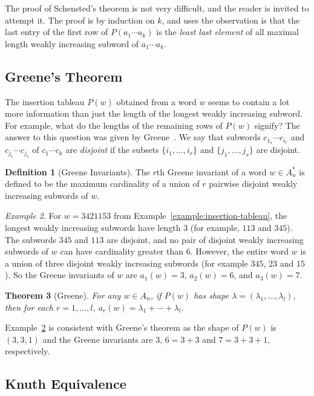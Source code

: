 \documentclass[10pt]{amsproc}
\newtheorem{theorem}{Theorem}[subsection]
\theoremstyle{definition}
\newtheorem{definition}[theorem]{Definition}
\theoremstyle{remark}
\newtheorem{example}[theorem]{Example}
\begin{document}
The proof of Schensted's theorem is not very difficult, and the reader is invited to attempt it.
The proof is by induction on $k$, and uses the observation is that the last entry of the first row of $P(a_1\dotsb a_k)$ is the \emph{least last element} of all maximal length weakly increasing subword of $a_1\dotsb a_k$.
\subsection{Greene's Theorem}
\label{sec:greenes-theorem}
The insertion tableau $P(w)$ obtained from a word $w$ seems to contain a lot more information than just the length of the longest weakly increasing subword.
For example, what do the lengths of the remaining rows of $P(w)$ signify?
The answer to this question was given by Greene~\cite{Greene-schen}.
We say that subwords $c_{1_1}\dotsb c_{i_r}$ and $c_{j_1}\dotsb c_{j_s}$ of $c_1\dotsb c_k$ are \emph{disjoint} if the subsets $\{i_1,\dotsc,i_r\}$ and $\{j_1,\dotsc,j_s\}$ are disjoint.
\begin{definition}
  [Greene Invariants]
  The $r$th Greene invariant of a word $w\in A_n^*$ is defined to be the maximum cardinality of a union of $r$ pairwise disjoint weakly increasing subwords of $w$.
\end{definition}
\begin{example}
  \label{example:greene}
  For $w=3421153$ from Example~\ref{example:insertion-tableau}, the longest weakly increasing subwords have length $3$ (for example, $113$ and $345$).
  The subwords $345$ and $113$ are disjoint, and no pair of disjoint weakly increasing subwords of $w$ can have cardinality greater than $6$.
  However, the entire word $w$ is a union of three disjoint weakly increasing subwords (for example $345$, $23$ and $15$).
  So the Greene invariants of $w$ are $a_1(w)=3$, $a_2(w)=6$, and $a_3(w)=7$.
\end{example}
\begin{theorem}
  [Greene]
  \label{theorem:greene}
  For any $w\in A_n$, if $P(w)$ has shape $\lambda=(\lambda_1,\dotsc, \lambda_l)$, then for each $r=1,\dotsc,l$, $a_r(w)=\lambda_1+\dotsb + \lambda_l$.
\end{theorem}
Example~\ref{example:greene} is consistent with Greene's theorem as the shape of $P(w)$ is $(3, 3, 1)$ and the Greene invariants are $3$, $6=3+3$ and $7=3+3+1$, respectively.

\subsection{Knuth Equivalence}
\label{sec:knuth-equivalence}
\end{document}
